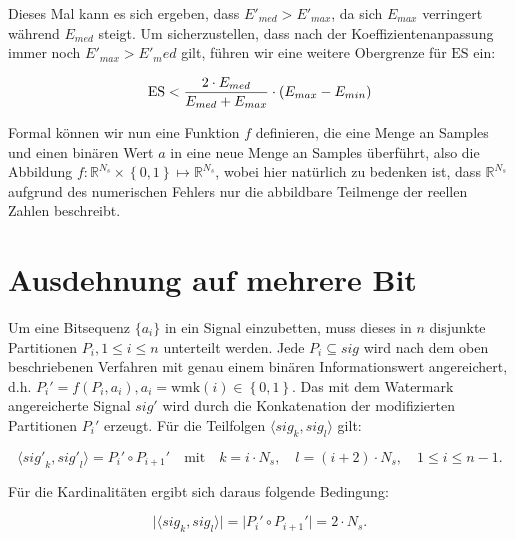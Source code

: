 Dieses Mal kann es sich ergeben, dass ${E'}_{med} > {E'}_{max}$, da sich ${E}_{max}$ verringert während ${E}_{med}$ steigt. Um sicherzustellen, dass nach der Koeffizientenanpassung immer noch ${E'}_{max} > {E'}_med$ gilt, führen wir eine weitere Obergrenze für $\mbox{ES}$ ein:

	\begin{equation}
		\mbox{ES} < { 2 \cdot {E}_{med} \over {E}_{med} + {E}_{max} } \cdot ( {E}_{max} - {E}_{min} )
		\label{equ:embeddingstrengthconstraint_case2}
	\end{equation}

Formal können wir nun eine Funktion $f$ definieren, die eine Menge an Samples und einen binären Wert $a$ in eine neue Menge an Samples überführt, also die Abbildung $f: {\mathbb{R}}^{{N}_{s}} \times \left\{0,1\right\} \mapsto  {\mathbb{R}}^{{N}_{s}}$, wobei hier natürlich zu bedenken ist, dass ${\mathbb{R}}^{{N}_{s}}$ aufgrund des numerischen Fehlers nur die abbildbare Teilmenge der reellen Zahlen beschreibt. 

\section{Ausdehnung auf mehrere Bit}
\label{sec:embeddingstragety_bitsequence}

Um eine Bitsequenz $\{{a}_{i}\}$ in ein Signal einzubetten, muss dieses in $n$ disjunkte Partitionen ${P}_{i}, {1}\leq{i}\leq{n}$ unterteilt werden. Jede ${P}_{i}\subseteq{sig}$ wird nach dem oben beschriebenen Verfahren mit genau einem binären Informationswert angereichert, d.h. ${P}_{i}'=f({P}_{i}, {a}_{i}), {a}_{i} = \mbox{wmk}(i)\in\left\{0,1\right\}$. Das mit dem Watermark angereicherte Signal $sig'$ wird durch die Konkatenation der modifizierten Partitionen ${P}_{i}'$ erzeugt. Für die Teilfolgen $\langle{sig}_{k},{sig}_{l}\rangle$ gilt:

	\begin{equation}
		\langle{sig'}_{k},{sig'}_{l}\rangle = {P}_{i}'\circ{P}_{i+1}' \quad\mbox{mit}\quad k=i \cdot {N}_{s},\quad l=(i+2) \cdot {N}_{s},\quad {1}\leq{i}\leq{n-1}.
		\label{equ:signalconcat}
	\end{equation}

Für die Kardinalitäten ergibt sich daraus folgende Bedingung:

	\begin{equation}
 	   \vert\langle{sig}_{k},{sig}_{l}\rangle\vert = \vert{P}_{i}'\circ{P}_{i+1}'\vert = 2 \cdot {N}_{s}.
	   \label{equ:signalcardinality}
	\end{equation}

